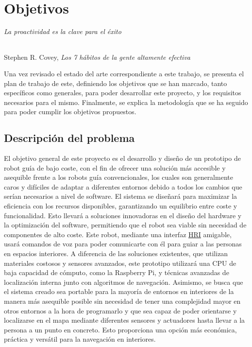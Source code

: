 \chapter{Objetivos}
\label{cap:capitulo3}

\begin{flushright}
\begin{minipage}[]{10cm}
\emph{La proactividad es la clave para el éxito}\\
\end{minipage}\\

Stephen R. Covey, \textit{Los 7 hábitos de la gente altamente efectiva}\\
\end{flushright}

\vspace{1cm}

Una vez revisado el estado del arte correspondiente a este trabajo, se presenta el plan de trabajo de este, definiendo los 
objetivos que se han marcado, tanto específicos como generales, para poder desarrollar este proyecto, y los requisitos necesarios para el mismo.
Finalmente, se explica la metodología que se ha seguido para poder cumplir los objetivos propuestos.



\section{Descripción del problema}
\label{sec:descripcion}


El objetivo general de este proyecto es el desarrollo y diseño de un prototipo de robot guía de bajo coste, con el fin de ofrecer una solución más accesible y asequible frente a los robots guía convencionales, los cuales son generalmente caros y difíciles de adaptar a diferentes entornos debido a todos los cambios que serían necesarios a nivel de software. El sistema se diseñará para maximizar la eficiencia con los recursos disponibles, garantizando un equilibrio entre coste y funcionalidad. Esto llevará a soluciones innovadoras en el diseño del hardware y la optimización del software, permitiendo que el robot sea viable sin necesidad de componentes de alto coste. Este robot, mediante una interfaz \hyperlink{HRI}{HRI} amigable, usará comandos de voz para poder comunicarte con él para guiar a las personas en espacios interiores. A diferencia de las soluciones existentes, que utilizan materiales costosos y sensores avanzados, este prototipo utilizará una CPU de baja capacidad de cómputo, como la Raspberry Pi, y técnicas avanzadas de localización interna  junto con algoritmos de navegación. Asimismo, se busca que el sistema creado sea portable para la mayoría de entornos en interiores de la manera más asequible posible sin necesidad de tener una complejidad mayor en otros entornos a la hora de programarlo y que sea capaz de poder orientarse y localizarse en el mapa mediante diferentes sensores y actuadores hasta llevar a la persona a un punto en concreto. Esto proporciona una opción más económica, práctica y versátil para la navegación en interiores.\\ 

